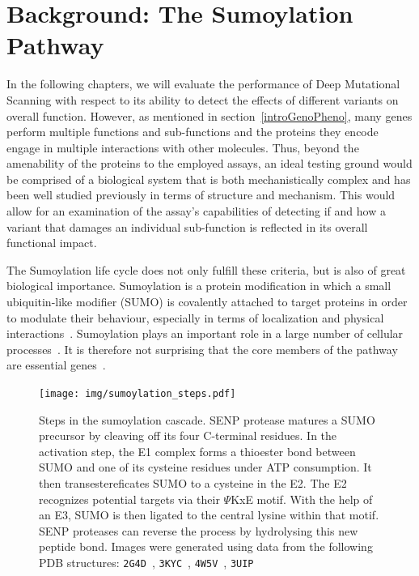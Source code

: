 
\section{Background: The Sumoylation Pathway}
\label{intro:sumoylation}

In the following chapters, we will evaluate the performance of Deep Mutational Scanning with respect to its ability to detect the effects of different variants on overall function. However, as mentioned in section~\ref{introGenoPheno}, many genes perform multiple functions and sub-functions and the proteins they encode engage in multiple interactions with other molecules. Thus, beyond the amenability of the proteins to the employed assays, an ideal testing ground would be comprised of a biological system that is both mechanistically complex and has been well studied previously in terms of structure and mechanism. This would allow for an examination of the assay's capabilities of detecting if and how a variant that damages an individual sub-function is reflected in its overall functional impact. 

The Sumoylation life cycle does not only fulfill these criteria, but is also of great biological importance. Sumoylation is a protein modification in which a small ubiquitin-like modifier (SUMO) is covalently attached to target proteins in order to modulate their behaviour, especially in terms of localization and physical interactions~\cite{geiss-friedlander_concepts_2007}. Sumoylation plays an important role in a large number of cellular processes~\cite{geiss-friedlander_concepts_2007}. It is therefore not surprising that the core members of the pathway are essential genes~\cite{nacerddine_sumo_2005}.

\begin{figure}
	\centering
	\texttt{[image: img/sumoylation\_steps.pdf]}
	\caption{Steps in the sumoylation cascade. SENP protease matures a SUMO precursor by cleaving off its four C-terminal residues. In the activation step, the E1 complex forms a thioester bond  between SUMO and one of its cysteine residues under ATP consumption. It then transestereficates SUMO to a cysteine in the E2. The E2 recognizes potential targets via their $\Psi$KxE motif. With the help of an E3, SUMO is then ligated to the central lysine within that motif. SENP proteases can reverse the process by hydrolysing this new peptide bond. Images were generated using data from the following PDB structures: \texttt{2G4D}~\cite{xu_crystal_2006}, \texttt{3KYC}~\cite{olsen_active_2010}, \texttt{4W5V}~\cite{reiter_characterization_2016}, \texttt{3UIP}~\cite{gareau_determinants_2012}}
	\label{fig:sumoylation_steps}
\end{figure}


